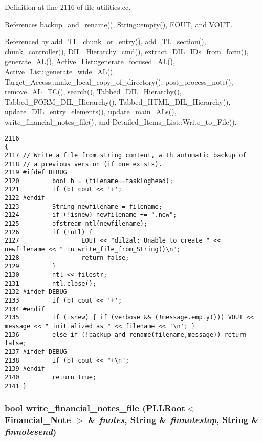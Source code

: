 Definition at line 2116 of file utilities.cc.

References backup\_\-and\_\-rename(), String::empty(), EOUT, and VOUT.

Referenced by add\_\-TL\_\-chunk\_\-or\_\-entry(), add\_\-TL\_\-section(), chunk\_\-controller(), DIL\_\-Hierarchy\_\-cmd(), extract\_\-DIL\_\-IDs\_\-from\_\-form(), generate\_\-AL(), Active\_\-List::generate\_\-focused\_\-AL(), Active\_\-List::generate\_\-wide\_\-AL(), Target\_\-Access::make\_\-local\_\-copy\_\-of\_\-directory(), post\_\-process\_\-note(), remove\_\-AL\_\-TC(), search(), Tabbed\_\-DIL\_\-Hierarchy(), Tabbed\_\-FORM\_\-DIL\_\-Hierarchy(), Tabbed\_\-HTML\_\-DIL\_\-Hierarchy(), update\_\-DIL\_\-entry\_\-elements(), update\_\-main\_\-ALs(), write\_\-financial\_\-notes\_\-file(), and Detailed\_\-Items\_\-List::Write\_\-to\_\-File().



\footnotesize\begin{verbatim}2116                                                                                                          {
2117 // Write a file from string content, with automatic backup of
2118 // a previous version (if one exists).
2119 #ifdef DEBUG
2120         bool b = (filename==taskloghead);
2121         if (b) cout << '+';
2122 #endif
2123         String newfilename = filename;
2124         if (!isnew) newfilename += ".new";
2125         ofstream ntl(newfilename);
2126         if (!ntl) {
2127                 EOUT << "dil2al: Unable to create " << newfilename << " in write_file_from_String()\n";
2128                 return false;
2129         }
2130         ntl << filestr;
2131         ntl.close();
2132 #ifdef DEBUG
2133         if (b) cout << '+';
2134 #endif
2135         if (isnew) { if (verbose && (!message.empty())) VOUT << message << " initialized as " << filename << '\n'; }
2136         else if (!backup_and_rename(filename,message)) return false;
2137 #ifdef DEBUG
2138         if (b) cout << "+\n";
2139 #endif
2140         return true;
2141 }
\end{verbatim}\normalsize 
{}
\subsubsection{\setlength{\rightskip}{0pt plus 5cm}bool write\_\-financial\_\-notes\_\-file ({\bf PLLRoot}$<$ {\bf Financial\_\-Note} $>$ \& {\em fnotes}, {\bf String} \& {\em finnotestop}, {\bf String} \& {\em finnotesend})}\label{dil2al_8hh_a368}




